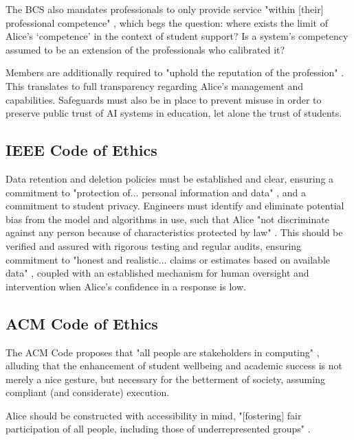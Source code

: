 \documentclass[14pt,a4paper]{article}
\begin{document}
\begin{multicols}{2}
The BCS also mandates professionals to only provide service "within [their] professional competence" \textit{\parencite[p. 2]{BCS2024}}, which begs the question: where exists the limit of Alice's `competence' in the context of student support?
Is a system's competency assumed to be an extension of the professionals who calibrated it?

Members are additionally required to "uphold the reputation of the profession" \textit{\parencite[p. 3]{BCS2024}}.
This translates to full transparency regarding Alice's management and capabilities.
Safeguards must also be in place to prevent misuse in order to preserve public trust of AI systems in education, let alone the trust of students.

\subsection{IEEE Code of Ethics}
Data retention and deletion policies must be established and clear, ensuring a commitment to "protection of... personal information and data" \textit{\parencite[p. 1]{IEEE2024}}, and a commitment to student privacy.
Engineers must identify and eliminate potential bias from the model and algorithms in use, such that Alice "not discriminate against any person because of characteristics protected by law" \textit{\parencite[p. 1]{IEEE2024}}.
This should be verified and assured with rigorous testing and regular audits, ensuring commitment to "honest and realistic... claims or estimates based on available data" \textit{\parencite[p. 2]{IEEE2024}}, coupled with an established mechanism for human oversight and intervention when Alice's confidence in a response is low.

\subsection{ACM Code of Ethics}
The ACM Code proposes that "all people are stakeholders in computing" \textit{\parencite[p. 1]{ACM2024}}, alluding that the enhancement of student wellbeing and academic success is not merely a nice gesture, but necessary for the betterment of society, assuming compliant (and considerate) execution.

Alice should be constructed with accessibility in mind, "[fostering] fair participation of all people, including those of underrepresented groups" \textit{\parencite[p. 2]{ACM2024}}.


\end{multicols}
\end{document}
